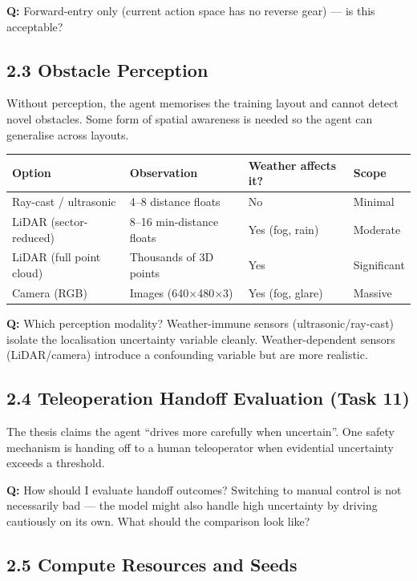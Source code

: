 \documentclass[11pt,a4paper]{article}
\newcommand{\question}[1]{\textcolor{question}{\textbf{Q:}} #1}
\begin{document}
\question{Forward-entry only (current action space has no reverse gear) --- is this acceptable?}

\subsection*{2.3 Obstacle Perception}

Without perception, the agent memorises the training layout and cannot detect novel obstacles. Some form of spatial awareness is needed so the agent can generalise across layouts.

\begin{table}[h]
\centering
\small
\begin{tabularx}{\textwidth}{@{}llXl@{}}
\toprule
\textbf{Option} & \textbf{Observation} & \textbf{Weather affects it?} & \textbf{Scope} \\
\midrule
Ray-cast / ultrasonic & 4--8 distance floats & No & Minimal \\
LiDAR (sector-reduced) & 8--16 min-distance floats & Yes (fog, rain) & Moderate \\
LiDAR (full point cloud) & Thousands of 3D points & Yes & Significant \\
Camera (RGB) & Images (640$\times$480$\times$3) & Yes (fog, glare) & Massive \\
\bottomrule
\end{tabularx}
\end{table}

\question{Which perception modality? Weather-immune sensors (ultrasonic/ray-cast) isolate the localisation uncertainty variable cleanly. Weather-dependent sensors (LiDAR/camera) introduce a confounding variable but are more realistic.}

\subsection*{2.4 Teleoperation Handoff Evaluation (Task 11)}

The thesis claims the agent ``drives more carefully when uncertain''. One safety mechanism is handing off to a human teleoperator when evidential uncertainty exceeds a threshold.

\question{How should I evaluate handoff outcomes? Switching to manual control is not necessarily bad --- the model might also handle high uncertainty by driving cautiously on its own. What should the comparison look like?}

\subsection*{2.5 Compute Resources and Seeds}
\end{document}
